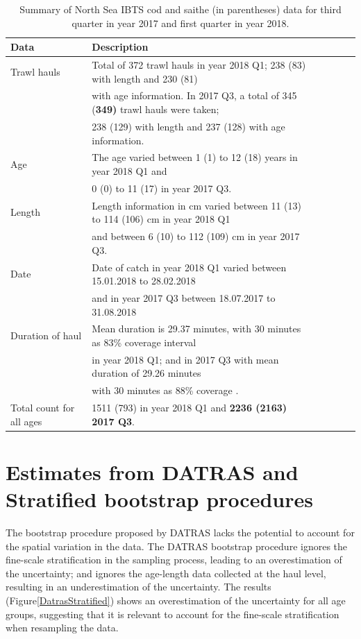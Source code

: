 \documentclass[a4paper 12pt]{article}
\numberwithin{equation}{section}
\begin{document}
\clearpage
\begin{small}
\begin{table}[h!]
\caption{Summary of North Sea IBTS cod and saithe (in parentheses) data for third quarter in year 2017 and first quarter in year 2018.}
\begin{tabular}{llllll}
\toprule
\bf Data&\bf Description \\
\midrule
Trawl hauls  & Total of 372 trawl hauls in year 2018 Q1; 238 (83)  with length and 230 (81) \\ & with age information. In 2017 Q3, a total of 345 {(\bf 349)} trawl hauls were taken; \\ & 238 (129) with length and 237 (128) with age information. \\[1.7ex]

Age &The age varied between 1 (1) to 12 (18) years in year 2018 Q1 and \\ & 0 (0) to 11 (17) in year 2017 Q3. \\[1.7ex]

Length & Length information in cm varied between 11 (13) to 114 (106) cm in year 2018 Q1 \\ & and between 6 (10) to 112 (109) cm in year 2017 Q3. \\[1.7ex]

Date&Date of catch in year 2018 Q1 varied between 15.01.2018 to 28.02.2018 \\ & and in year 2017 Q3 between 18.07.2017 to 31.08.2018 \\[1.7ex]

Duration of haul & Mean duration is 29.37 minutes, with 30 minutes as 83\% coverage interval \\ & in year 2018 Q1; and in 2017 Q3 with mean duration of 29.26 minutes \\ & with 30 minutes as 88\% coverage . \\[1.7ex]

Total count for all ages & 1511 (793) in year 2018 Q1 and {\bf 2236 (2163) 2017 Q3}. \\[0.5ex]
\bottomrule
\end{tabular}
\label{tab:data2018}
\end{table}
\end{small}



\section{\large Estimates from DATRAS and Stratified bootstrap procedures}
\label{secAp:resultsdatrasALK}
The bootstrap procedure proposed by DATRAS lacks the potential to account for the spatial variation in the data. The DATRAS bootstrap procedure ignores the fine-scale stratification in the sampling process, leading to an overestimation of the uncertainty; and ignores the age-length data collected at the haul level, resulting in an underestimation of the uncertainty. The results (Figure\ref{DatrasStratified}) shows an overestimation of the uncertainty for all age groups, suggesting that it is relevant to account for the fine-scale stratification when resampling the data.
\end{document}
